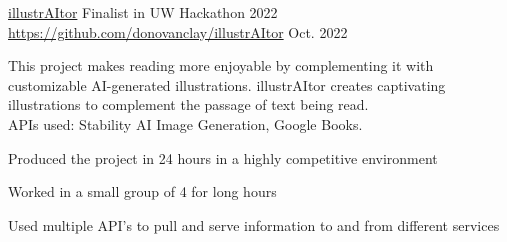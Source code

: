 \entry
    {\href{https://devpost.com/software/illustraitor}{illustrAItor}}
    {Finalist in UW Hackathon 2022 \quad\href{https://github.com/donovanclay/illustrAItor}{https://github.com/donovanclay/illustrAItor}}
    {Oct. 2022}
    {
        This project makes reading more enjoyable by complementing it with customizable AI-generated illustrations. illustrAItor creates captivating illustrations to complement the passage of text being read.\\
        APIs used: Stability AI Image Generation, Google Books.
        \begin{condenseditemize}
            \item Produced the project in 24 hours in a highly competitive environment
            \item Worked in a small group of 4 for long hours
            \item Used multiple API's to pull and serve information to and from different services
        \end{condenseditemize}
    }
    